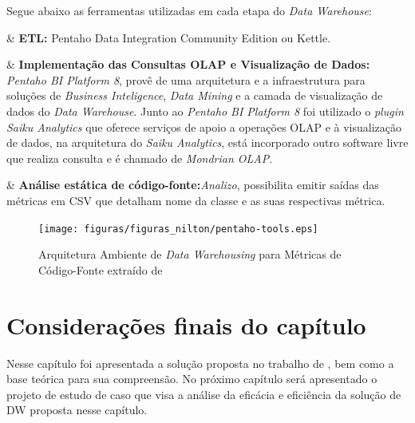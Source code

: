 Segue abaixo as ferramentas utilizadas em cada etapa do \textit{Data Warehouse}:

\begin{easylist}[itemize]

	& \textbf{ETL:} Pentaho Data Integration Community Edition ou Kettle.
	 
	& \textbf{Implementação das Consultas OLAP e Visualização de Dados:} \textit{Pentaho BI Platform 8}, provê de uma arquitetura e a infraestrutura para soluções de \textit{Business Inteligence}, \textit{Data Mining} e a camada de visualização de dados do \textit{Data Warehouse}. Junto ao \textit{Pentaho BI Platform 8} foi utilizado o \textit{plugin Saiku Analytics} que oferece serviços de apoio a operações OLAP e à visualização de dados, na arquitetura do \textit{Saiku Analytics}, está incorporado outro software livre que realiza consulta e é chamado de \textit{Mondrian OLAP}. 
	
	& \textbf{Análise estática de código-fonte:}\textit{Analizo}, possibilita emitir saídas das métricas em CSV que detalham nome da classe e as suas respectivas métrica.

	\end{easylist}
	
	\begin{figure}[h!]
\centering
\texttt{[image: figuras/figuras\_nilton/pentaho-tools.eps]}
\caption{Arquitetura Ambiente de \textit{Data Warehousing} para Métricas de Código-Fonte extraído de }
\label{fig:arquiteturaAmbiente}
\end{figure}
\FloatBarrier

\section{Considerações finais do capítulo}

Nesse capítulo foi apresentada a solução proposta no trabalho de , bem como a base teórica para sua compreensão. No próximo capítulo será apresentado o projeto de estudo de caso que visa a análise da eficácia e eficiência da solução de DW proposta nesse capítulo.
